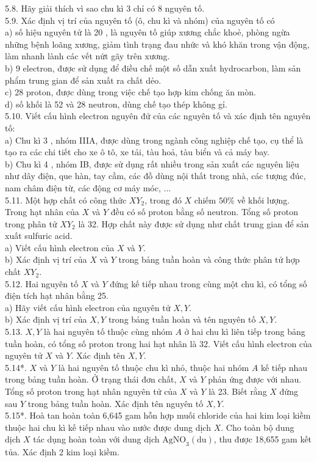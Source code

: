 \documentclass[10pt]{article}
\begin{document}
5.8. Hãy giải thích vì sao chu kì 3 chỉ có 8 nguyên tố.\\
5.9. Xác định vị trí của nguyên tố (ô, chu kì và nhóm) của nguyên tố có\\
a) số hiệu nguyên tử là 20 , là nguyên tố giúp xương chắc khoẻ, phòng ngừa những bệnh loãng xương, giảm tình trạng đau nhức và khó khăn trong vận động, làm nhanh lành các vết nứt gãy trên xương.\\
b) 9 electron, được sử dụng để điều chế một số dẫn xuất hydrocarbon, làm sản phẩm trung gian để sản xuất ra chất dẻo.\\
c) 28 proton, được dùng trong việc chế tạo hợp kim chống ăn mòn.\\
d) số khối là 52 và 28 neutron, dùng chế tạo thép không gỉ.\\
5.10. Viết cấu hình electron nguyên đử của các nguyên tố và xác định tên nguyên tố:\\
a) Chu kì 3 , nhóm IIIA, được dùng trong ngành công nghiệp chế tạo, cụ thể là tạo ra các chi tiết cho xe ô tô, xe tải, tàu hoả, tàu biển và cả máy bay.\\
b) Chu kì 4 , nhóm IB, được sử dụng rất nhiều trong sản xuất các nguyên liệu như dây điện, que hàn, tay cầm, các đồ dùng nội thất trong nhà, các tượng đúc, nam châm điện từ, các động cơ máy móc, ...\\
5.11. Một hợp chất có công thức $X Y_{2}$, trong đó $X$ chiếm $50 \%$ về khối lượng. Trong hạt nhân của $X$ và $Y$ đều có số proton bằng số neutron. Tổng số proton trong phân tử $X Y_{2}$ là 32. Hợp chất này được sử dụng như chất trung gian để sản xuất sulfuric acid.\\
a) Viết cấu hình electron của $X$ và $Y$.\\
b) Xác định vị trí của $X$ và $Y$ trong bảng tuần hoàn và công thức phân tử hợp chất $X Y_{2}$.\\
5.12. Hai nguyên tố $X$ và $Y$ đứng kế tiếp nhau trong cùng một chu kì, có tổng số điện tích hạt nhân bằng 25.\\
a) Hãy viết cấu hình electron của nguyên tử $X, Y$.\\
b) Xác định vị trí của $X, Y$ trong bảng tuần hoàn và tên nguyên tố $X, Y$.\\
5.13. $X, Y$ là hai nguyên tố thuộc cùng nhóm $A$ ở hai chu kì liên tiếp trong bảng tuần hoàn, có tổng số proton trong hai hạt nhân là 32. Viết cấu hình electron của nguyên tử $X$ và $Y$. Xác định tên $X, Y$.\\
5.14*. $X$ và $Y$ là hai nguyên tố thuộc chu kì nhỏ, thuộc hai nhóm $A$ kế tiếp nhau trong bảng tuần hoàn. Ở trạng thái đơn chất, $X$ và $Y$ phản ứng được với nhau. Tổng số proton trong hạt nhân nguyên tử của $X$ và $Y$ là 23. Biết rằng $X$ đứng sau $Y$ trong bảng tuần hoàn. Xác định tên nguyên tố $X, Y$.\\
5.15*. Hoà tan hoàn toàn 6,645 gam hỗn hợp muối chloride của hai kim loại kiềm thuộc hai chu kì kế tiếp nhau vào nước được dung dịch $X$. Cho toàn bộ dung dịch $X$ tác dụng hoàn toàn với dung dịch $\mathrm{AgNO}_{3}(\mathrm{du})$, thu được 18,655 gam kết tủa. Xác định 2 kim loại kiềm.
\end{document}

